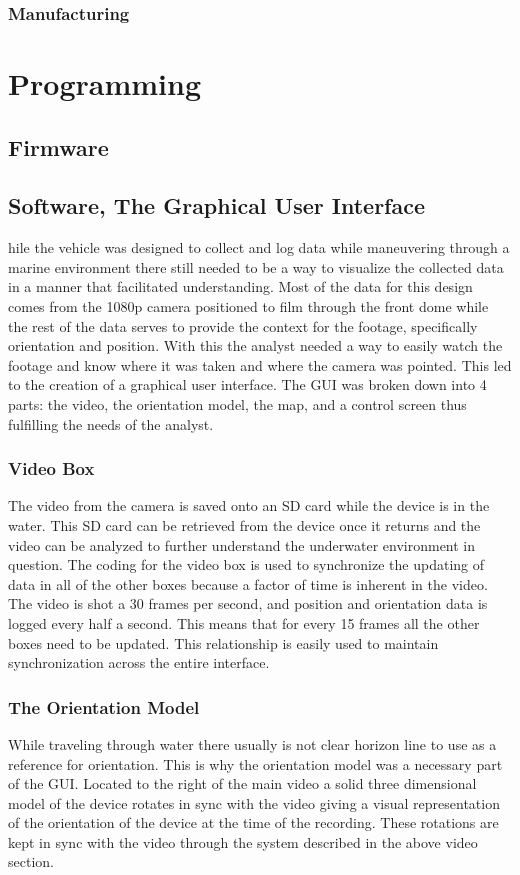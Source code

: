 \documentclass{report}
\begin{document}
\subsubsection{Manufacturing}
\section{Programming}
\subsection{Firmware}
\subsection{Software, The Graphical User Interface}
hile the vehicle was designed to collect and log data while maneuvering through a marine environment there still needed to be a way to visualize the collected data in a manner that facilitated understanding. Most of the data for this design comes from the 1080p camera positioned to film through the front dome while the rest of the data serves to provide the context for the footage, specifically orientation and position. With this the analyst needed a way to easily watch the footage and know where it was taken and where the camera was pointed. This led to the creation of a graphical user interface. The GUI was broken down into 4 parts: the video, the orientation model, the map, and a control screen thus fulfilling the needs of the analyst.
\subsubsection{Video Box}
The video from the camera is saved onto an SD card while the device is in the water. This SD card can be retrieved from the device once it returns and the video can be analyzed to further understand the underwater environment in question. The coding for the video box is used to synchronize the updating of data in all of the other boxes because a factor of time is inherent in the video. The video is shot a 30 frames per second, and position and orientation data is logged every half a second. This means that for every 15 frames all the other boxes need to be updated. This relationship is easily used to maintain synchronization across the entire interface.
\subsubsection{The Orientation Model}
While traveling through water there usually is not clear horizon line to use as a reference for orientation. This is why the orientation model was a necessary part of the GUI. Located to the right of the main video a solid three dimensional model of the device rotates in sync with the video giving a visual representation of the orientation of the device at the time of the recording. These rotations are kept in sync with the video through the system described in the above video section.
\end{document}
